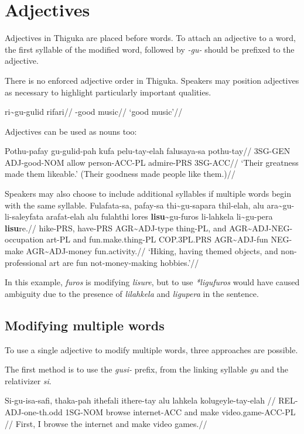 
\section{Adjectives}
Adjectives in Thiguka are placed before words.
To attach an adjective to a word, the first syllable of the modified word, followed by \emph{-gu-} should be prefixed to the adjective.

There is no enforced adjective order in Thiguka. Speakers may position adjectives as necessary to highlight particularly important qualities.

\ex
\begingl
    \gla ri\~{}{}gu-gulid rifari//
    \glb \agradj{}-good music//
    \glft`good music'//
\endgl
\xe

Adjectives can be used as nouns too:

\ex
\begingl
    \gla Pothu-pafay gu-gulid-pah kufa pelu-tay-elah falusaya-sa pothu-tay//
    \glb 3SG-GEN ADJ-good-NOM allow person-ACC-PL admire-PRS 3SG-ACC//
    \glft`Their greatness made them likeable.' (Their goodness made people like them.)//
\endgl
\xe

Speakers may also choose to include additional syllables if multiple words begin with the same syllable.
\begingl
\ex
    \gla Fulafata-sa, pafay-sa thi\~{}gu-sapara thil-elah, alu ara\~{}gu-li-saleyfata arafat-elah alu fulahthi lores \textbf{lisu}\~{}gu-furos li-lahkela li\~{}gu-pera \textbf{lisu}re.//
    \glb hike-PRS, have-PRS AGR\~{}ADJ-type thing-PL, and AGR\~{}ADJ-NEG-occupation art-PL and fun.make.thing-PL COP.3PL.PRS AGR\~{}ADJ-fun NEG-make AGR\~{}ADJ-money fun.activity.//
    \glft `Hiking, having themed objects, and non-professional art are fun not-money-making hobbies.'//
\endgl
\xe    

In this example, \textit{furos} is modifying \textit{lisure}, but to use \textit{*ligufuros} would have caused ambiguity due to the presence of \textit{lilahkela} and \textit{ligupera} in the sentence.

\subsection{Modifying multiple words}
To use a single adjective to modify multiple words, three approaches are possible.

The first method is to use the \textit{gusi-} prefix, from the linking syllable \textit{gu} and the relativizer \textit{si}.

\ex
\begingl
\gla Si-gu-isa-safi,    thaka-pah ithefali ithere-tay alu lahkela kolugeyle-tay-elah   //
\glb             REL-ADJ-one-th.odd 1SG-NOM   browse   internet-ACC and make    video.game-ACC-PL  //
\glft First, I browse the internet and make video games.//
\endgl
\xe

